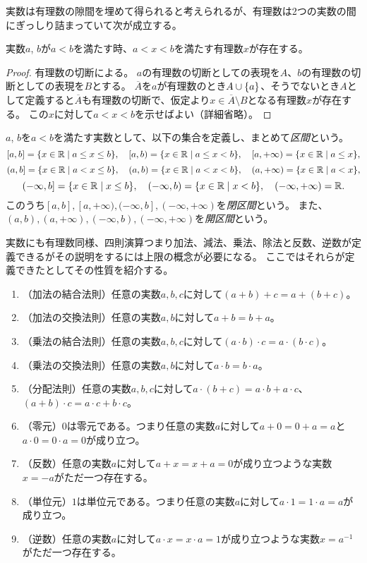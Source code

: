 実数は有理数の隙間を埋めて得られると考えられるが、有理数は2つの実数の間にぎっしり詰まっていて次が成立する。

\begin{proposition}[有理数の稠密性]
\label{t_dense_rational}
実数$a$, $b$が$a < b$を満たす時、$a < x < b$を満たす有理数$x$が存在する。
\end{proposition}

\begin{proof}
有理数の切断による。
$a$の有理数の切断としての表現を$A$、$b$の有理数の切断としての表現を$B$とする。
$\overline{A}$を$a$が有理数のとき$A\cup\{ a \}$、そうでないとき$A$として定義すると$\overline{A}$も有理数の切断で、仮定より$x \in \overline{A}\setminus B$となる有理数$x$が存在する。
この$x$に対して$a < x < b$を示せばよい（詳細省略）。
\end{proof}

\begin{definition}[区間]
$a$, $b$を$a < b$を満たす実数として、以下の集合を定義し、まとめて\emph{区間}という。
$$
[a, b] = \{ x \in \mathbb{R} \mid a \le x \le b \},
\quad [a, b) = \{ x \in \mathbb{R} \mid a \le x < b \},
\quad [a, +\infty) = \{ x \in \mathbb{R} \mid a \le x \},
$$
$$
(a, b] = \{ x \in \mathbb{R} \mid a < x \le b \},
\quad (a, b) = \{ x \in \mathbb{R} \mid a < x < b \},
\quad (a, +\infty) = \{ x \in \mathbb{R} \mid a < x \},
$$
$$
(-\infty, b] = \{ x \in \mathbb{R} \mid x \le b \},
\quad (-\infty, b) = \{ x \in \mathbb{R} \mid x < b \},
\quad (-\infty, +\infty) = \mathbb{R}.
$$
このうち$[a, b], [a, +\infty), (-\infty, b], (-\infty, +\infty)$を\emph{閉区間}という。
また、$(a, b), (a, +\infty), (-\infty, b), (-\infty, +\infty)$を\emph{開区間}という。
\end{definition}

実数にも有理数同様、四則演算つまり加法、減法、乗法、除法と反数、逆数が定義できるがその説明をするには上限の概念が必要になる。
ここではそれらが定義できたとしてその性質を紹介する。
\begin{enumerate}
\item
（加法の結合法則）任意の実数$a, b, c$に対して$(a+b)+c = a+(b+c)$。
\item
（加法の交換法則）任意の実数$a, b$に対して$a+b = b+a$。
\item
（乗法の結合法則）任意の実数$a, b, c$に対して$(a\cdot b)\cdot c = a\cdot (b\cdot c)$。
\item
（乗法の交換法則）任意の実数$a, b$に対して$a\cdot b = b\cdot a$。
\item
（分配法則）任意の実数$a, b, c$に対して$a\cdot (b+c) = a\cdot b+a\cdot c$、$(a+b)\cdot c = a\cdot c+b\cdot c$。
\item
（零元）$0$は零元である。つまり任意の実数$a$に対して$a+0 = 0+a = a$と$a\cdot 0 = 0\cdot a = 0$が成り立つ。
\item
（反数）任意の実数$a$に対して$a+x = x+a = 0$が成り立つような実数$x = -a$がただ一つ存在する。
\item
（単位元）$1$は単位元である。つまり任意の実数$a$に対して$a\cdot 1 = 1\cdot a = a$が成り立つ。
\item
（逆数）任意の実数$a$に対して$a\cdot x = x\cdot a = 1$が成り立つような実数$x = a^{-1}$がただ一つ存在する。
\end{enumerate}


